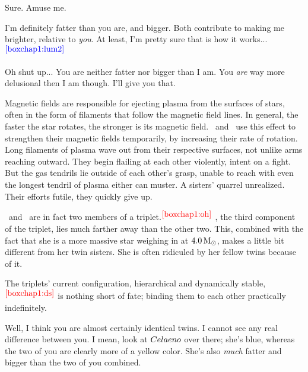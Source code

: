 \documentclass[main.tex]{subfiles}
\begin{document}
\par \Alcyone Sure.  Amuse me.

\par \Taygete I'm definitely fatter than you are, and bigger.  Both contribute to making me brighter, relative to \textit{you}.  At least, I'm pretty sure that is how it works...$^{\textcolor{blue}{\ref{boxchap1:lum2}}}$



\par \Alcyone Oh shut up...  You are neither fatter nor bigger than I am.  You \textit{are} way more delusional then I am though.  I'll give you that.

\par \nar Magnetic fields are responsible for ejecting plasma from the surfaces of stars, often in the form of filaments that follow the magnetic field lines.  In general, the faster the star rotates, the stronger is its magnetic field.  \rmtaygete~and \rmalcyone~use this effect to strengthen their magnetic fields temporarily, by increasing their rate of rotation.  Long filaments of plasma wave out from their respective surfaces, not unlike arms reaching outward.  They begin flailing at each other violently, intent on a fight.  But the gas tendrils lie outside of each other's grasp, unable to reach with even the longest tendril of plasma either can muster.  A sisters' quarrel unrealized.  Their efforts futile, they quickly give up.  

\par \nar \rmtaygete~and \rmalcyone~are in fact two members of a triplet.$^{\textcolor{red}{\ref{boxchap1:oh}}}$  \rmcelaeno, the third component of the triplet, lies much farther away than the other two.  This, combined with the fact that she is a more massive star weighing in at $4.0\,\mathrm{M}_\odot$, makes \rmcelaeno a little bit different from her twin sisters.  She is often ridiculed by her fellow twins because of it.

\par \nar The triplets' current configuration, hierarchical and dynamically stable,$^{\textcolor{red}{\ref{boxchap1:ds}}}$ is nothing short of fate; binding them to each other practically indefinitely.

\par \Maia Well, I think you are almost certainly identical twins.  I cannot see any real difference between you.  I mean, look at $Celaeno$ over there; she's blue, whereas the two of you are clearly more of a yellow color.  She's also \textit{much} fatter and bigger than the two of you combined.  
\end{document}
